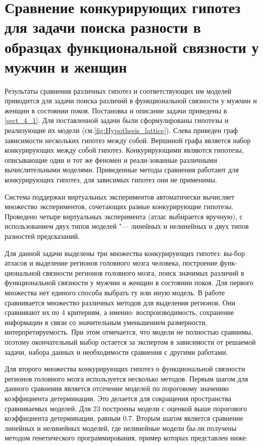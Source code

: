 \section{Сравнение конкурирующих гипотез для задачи поиска разности в образцах функциональной связности у мужчин и женщин}

Результаты сравнения различных гипотез и соответствующих им моделей приводится для задачи поиска различий в функциональной связности у мужчин и женщин в состоянии покоя. Постановка и описание задачи приведены в \cref{sect_4_1}. Для поставленной задачи были сформулированы гипотезы и реализующие их модели (см.\cref{fig:Hypothesis_lattice}). Слева приведен граф зависимости нескольких гипотез между собой. Вершиной графа является набор конкурирующих между собой гипотез. Конкурирующими являются гипотезы, описывающие один и тот же феномен и реали-зованные различными вычислительными моделями. Приведенные методы сравнения работают для конкурирующих гипотез, для зависимых гипотез они не применимы.

Система поддержки виртуальных экспериментов автоматически вычисляет множество экспериментов, сочетающих разные конкурирующие гипотезы. Проведено четыре виртуальных эксперимента (атлас выбирается вручную), с использованием двух типов моделей "--- линейных и нелинейных и двух типов разностей предсказаний.

Для данной задачи выделены три множества конкурирующих гипотез: вы-бор атласов и выделение регионов головного мозга человека, построение функ-циональной связности регионов головного мозга, поиск значимых различий в функциональной связности у мужчин и женщин в состоянии покоя. Для первого множества нет единого способа выбрать ту или иную модель. В работе \cite{Arslan2018} сравнивается множество различных методов для выделения регионов. Они сравнивают их по 4 критериям, а именно: воспроизводимость, сохранение информации в связи со значительным уменьшением размерности, интерпретируемость. При этом отмечается, что модели не полностью сравнимы, поэтому окончательный выбор остается за экспертом в зависимости от решаемой задачи, набора данных и необходимости сравнения с другими работами. 

Для второго множества конкурирующих гипотез о функциональной связности регионов головного мозга используется несколько методов. Первым шагом для данного сравнения является отсечение моделей по пороговому значению коэффициента детерминации. Это делается для сокращения пространства сравниваемых моделей. Для 23 построены модели с оценкой выше порогового коэффициента детерминации, равным 0.7. Вторым шагом является сравнение линейных и нелинейных моделей, где нелинейные модели бы-ли получены методом генетического программирования, пример которых представлен ниже:

